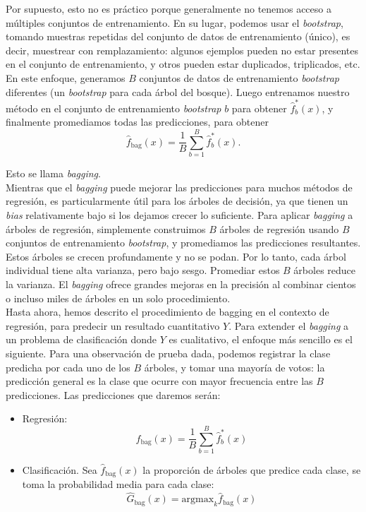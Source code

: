 Por supuesto, esto no es práctico porque generalmente no tenemos acceso a múltiples conjuntos de entrenamiento. En su lugar, podemos usar el \textit{bootstrap}, tomando muestras repetidas del conjunto de datos de entrenamiento (único), es decir, muestrear con remplazamiento: algunos ejemplos pueden no estar presentes en el conjunto de entrenamiento, y otros pueden estar duplicados, triplicados, etc. En este enfoque, generamos $B$ conjuntos de datos de entrenamiento \textit{bootstrap} diferentes (un \textit{bootstrap} para cada árbol del bosque). Luego entrenamos nuestro método en el conjunto de entrenamiento \textit{bootstrap} $b$ para obtener $\hat{f}^*_b(x)$, y finalmente promediamos todas las predicciones, para obtener
\begin{equation}
\hat{f}_{\text{bag}}(x) = \frac{1}{B} \sum_{b=1}^{B} \hat{f}^*_b(x).
\end{equation}

\noindent Esto se llama \textit{bagging}. \\

Mientras que el \textit{bagging} puede mejorar las predicciones para muchos métodos de regresión, es particularmente útil para los árboles de decisión, ya que tienen un \textit{bias} relativamente bajo si los dejamos crecer lo suficiente. Para aplicar \textit{bagging} a árboles de regresión, simplemente construimos $B$ árboles de regresión usando $B$ conjuntos de entrenamiento \textit{bootstrap}, y promediamos las predicciones resultantes. Estos árboles se crecen profundamente y no se podan. Por lo tanto, cada árbol individual tiene alta varianza, pero bajo sesgo. Promediar estos $B$ árboles reduce la varianza. El \textit{bagging} ofrece grandes mejoras en la precisión al combinar cientos o incluso miles de árboles en un solo procedimiento. \\

Hasta ahora, hemos descrito el procedimiento de bagging en el contexto de regresión, para predecir un resultado cuantitativo $Y$. Para extender el \textit{bagging} a un problema de clasificación donde $Y$ es cualitativo, el enfoque más sencillo es el siguiente. Para una observación de prueba dada, podemos registrar la clase predicha por cada uno de los $B$ árboles, y tomar una mayoría de votos: la predicción general es la clase que ocurre con mayor frecuencia entre las $B$ predicciones. Las predicciones que daremos serán: 
\begin{itemize}
\item Regresión: 
\begin{equation}
\hat{f}_{\text{bag}}(x) = \frac{1}{B} \sum_{b=1}^{B} \hat{f}^*_b(x)
\end{equation}
\item Clasificación. Sea $\hat{f}_{\text{bag}} (x)$ la proporción de árboles que predice cada clase, se toma la probabilidad media para cada clase:
\begin{equation}
\hat{G}_{\text{bag}}(x) = \text{argmax}_k \hat{f}_{\text{bag}} (x)
\end{equation}
\end{itemize}

